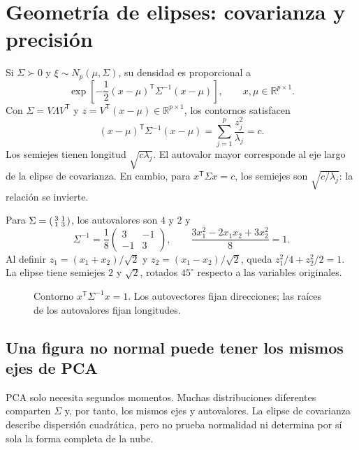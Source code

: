 \documentclass[11pt,a4paper]{article}
\newcommand{\R}{\mathbb R}
\newcommand{\T}{^{\mathsf T}}
\theoremstyle{definition}
\begin{document}
\section{Geometría de elipses: covarianza y precisión}
Si $\Sigma\succ0$ y $\xi\sim N_p(\mu,\Sigma)$, su densidad es proporcional a
\[
\exp\left[-\frac12(x-\mu)\T\Sigma^{-1}(x-\mu)\right],\qquad x,\mu\in\R^{p\times1}.
\]
Con $\Sigma=V\Lambda V\T$ y $z=V\T(x-\mu)\in\R^{p\times1}$, los contornos satisfacen
\[
(x-\mu)\T\Sigma^{-1}(x-\mu)=\sum_{j=1}^p\frac{z_j^2}{\lambda_j}=c.
\]
Los semiejes tienen longitud $\sqrt{c\lambda_j}$. El autovalor mayor corresponde al eje largo de la elipse de covarianza. En cambio, para $x\T\Sigma x=c$, los semiejes son $\sqrt{c/\lambda_j}$: la relación se invierte.
\begin{ejemplo}
Para $\Sigma=\begin{psmallmatrix}3&1\\1&3\end{psmallmatrix}$, los autovalores son $4$ y $2$ y
\[
\Sigma^{-1}=\frac18\begin{pmatrix}3&-1\\-1&3\end{pmatrix},\qquad
\frac{3x_1^2-2x_1x_2+3x_2^2}{8}=1.
\]
Al definir $z_1=(x_1+x_2)/\sqrt2$ y $z_2=(x_1-x_2)/\sqrt2$, queda $z_1^2/4+z_2^2/2=1$. La elipse tiene semiejes $2$ y $\sqrt2$, rotados $45^\circ$ respecto a las variables originales.
\end{ejemplo}
\begin{figure}[H]\centering
{}
\caption{Contorno $x\T\Sigma^{-1}x=1$. Los autovectores fijan direcciones; las raíces de los autovalores fijan longitudes.}
\end{figure}
\subsection{Una figura no normal puede tener los mismos ejes de PCA}
PCA solo necesita segundos momentos. Muchas distribuciones diferentes comparten $\Sigma$ y, por tanto, los mismos ejes y autovalores. La elipse de covarianza describe dispersión cuadrática, pero no prueba normalidad ni determina por sí sola la forma completa de la nube.
\end{document}
